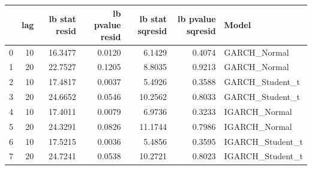 \begin{table}[htbp]
\centering
\begin{tabular}{lrrrrrl}
\toprule
 & lag & lb stat resid & lb pvalue resid & lb stat sqresid & lb pvalue sqresid & Model \\
\midrule
0 & 10 & 16.3477 & 0.0120 & 6.1429 & 0.4074 & GARCH_Normal \\
1 & 20 & 22.7527 & 0.1205 & 8.8035 & 0.9213 & GARCH_Normal \\
2 & 10 & 17.4817 & 0.0037 & 5.4926 & 0.3588 & GARCH_Student_t \\
3 & 20 & 24.6652 & 0.0546 & 10.2562 & 0.8033 & GARCH_Student_t \\
4 & 10 & 17.4011 & 0.0079 & 6.9736 & 0.3233 & IGARCH_Normal \\
5 & 20 & 24.3291 & 0.0826 & 11.1744 & 0.7986 & IGARCH_Normal \\
6 & 10 & 17.5215 & 0.0036 & 5.4856 & 0.3595 & IGARCH_Student_t \\
7 & 20 & 24.7241 & 0.0538 & 10.2721 & 0.8023 & IGARCH_Student_t \\
\bottomrule
\end{tabular}
\label{tab:garch_baseline_diagnostics}
\end{table}
